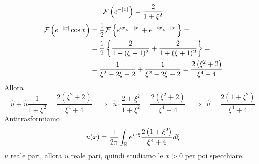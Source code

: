 \begin{gather*}
\mathcal{F} \left(e^{- | x|}\right) = \frac{2}{1 + \xi^{2}}\\
\begin{aligned}
\mathcal{F} \left(e^{- | x|}\cos x\right) & = \frac{1}{2}\mathcal{F} \left\{e^{ix} e^{- | x|} + e^{- ix} e^{- | x|}\right\} = \\
 & = \frac{1}{2}\left\{\frac{2}{1 + (\xi - 1)^{2}} + \frac{2}{1 + (\xi + 1)^{2}}\right\} = \\
 & = \frac{1}{\xi^{2} - 2\xi + 2} + \frac{1}{\xi^{2} - 2\xi + 2} = \frac{2\left(\xi^{2} + 2\right)}{\xi^{4} + 4}
\end{aligned}
\end{gather*}
Allora
\begin{equation*}
\hat{u} + \hat{u}\frac{1}{1 + \xi^{2}} = \frac{2\left(\xi^{2} + 2\right)}{\xi^{4} + 4} \ \ \implies \ \ \hat{u} \cdot \frac{2 + \xi^{2}}{1 + \xi^{2}} = \frac{2\left(\xi^{2} + 2\right)}{\xi^{4} + 4} \ \ \implies \ \ \hat{u} = \frac{2\left(1 + \xi^{2}\right)}{\xi^{4} + 4}
\end{equation*}
Antitrasformiamo
\begin{equation*}
u(x) = \frac{1}{2\pi}\int_{\mathbb{R}} e^{ix\xi}\frac{2\left(1 + \xi^{2}\right)}{\xi^{4} + 4} d\xi
\end{equation*}
$\hat{u}$ reale pari, allora $u$ reale pari, quindi studiamo le $x > 0$ per poi specchiare.

